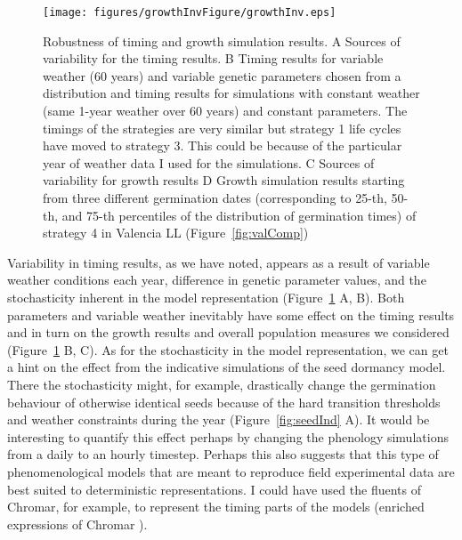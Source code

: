 \begin{figure}[tb]
\centering
\texttt{[image: figures/growthInvFigure/growthInv.eps]}
\caption{Robustness of timing and growth simulation results.  A Sources of
  variability for the timing results. B Timing results for variable weather (60
  years) and variable genetic parameters chosen from a distribution and timing
  results for simulations with constant weather (same 1-year weather over 60
  years) and constant parameters. The timings of the strategies are very similar
  but strategy 1 life cycles have moved to strategy 3. This could be because of
  the particular year of weather data I used for the simulations. C Sources of
  variability for growth results D Growth simulation results starting from three
  different germination dates (corresponding to 25-th, 50-th, and 75-th
  percentiles of the distribution of germination times) of strategy 4 in
  Valencia LL (Figure~\ref{fig:valComp})}
\label{fig:growthInv}
\end{figure}

Variability in timing results, as we have noted, appears as a result of variable
weather conditions each year, difference in genetic parameter values, and the
stochasticity inherent in the model representation (Figure~\ref{fig:growthInv}
A, B). Both parameters and variable weather inevitably have some effect on the
timing results and in turn on the growth results and overall population measures
we considered (Figure~\ref{fig:growthInv} B, C). As for the stochasticity in the
model representation, we can get a hint on the effect from the indicative
simulations of the seed dormancy model. There the stochasticity might, for
example, drastically change the germination behaviour of otherwise identical
seeds because of the hard transition thresholds and weather constraints during
the year (Figure~\ref{fig:seedInd} A). It would be interesting to quantify this
effect perhaps by changing the phenology simulations from a daily to an hourly
timestep. Perhaps this also suggests that this type of phenomenological models
that are meant to reproduce field experimental data are best suited to
deterministic representations. I could have used the fluents of Chromar, for
example, to represent the timing parts of the models (enriched expressions of
Chromar ).

